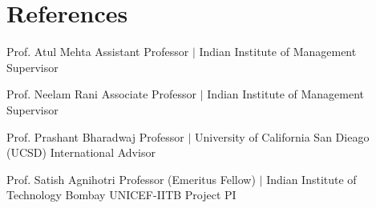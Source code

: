 \section{References}
  \CVSubHeadingListStart
    
    \CVSubheading
      {Prof. Atul Mehta}
      {}
      {Assistant Professor $|$ Indian Institute of Management}
      {Supervisor}
      \CVItemListStart
      \CVItemListEnd

    \CVSubheading
      {Prof. Neelam Rani}
      {}
      {Associate Professor $|$ Indian Institute of Management}
      {Supervisor}
      \CVItemListStart
      \CVItemListEnd

    \CVSubheading
      {Prof. Prashant Bharadwaj}
      {}
      {Professor $|$ University of California San Dieago (UCSD)}
      {International Advisor}
      \CVItemListStart
      \CVItemListEnd

    \CVSubheading
      {Prof. Satish Agnihotri}
      {}
      {Professor (Emeritus Fellow) $|$ Indian Institute of Technology Bombay}
      {UNICEF-IITB Project PI}
      \CVItemListStart
      \CVItemListEnd

      
  
    \CVSubHeadingListEnd